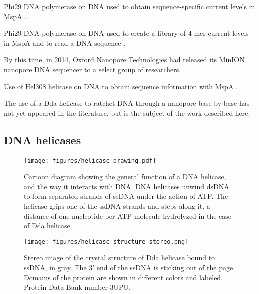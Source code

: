 Phi29 DNA polymerase on DNA used to obtain sequence-specific current levels in MspA \citep{Manrao2012}.

Phi29 DNA polymerase on DNA used to create a library of 4-mer current levels in MspA and to read a DNA sequence \citep{Laszlo2014}.

By this time, in 2014, Oxford Nanopore Technologies had released its MinION nanopore DNA sequencer to a select group of researchers.

Use of Hel308 helicase on DNA to obtain sequence information with MspA \citep{Derrington2015}.

The use of a Dda helicase to ratchet DNA through a nanopore base-by-base has not yet appeared in the literature, but is the subject of the work described here.

\subsection{DNA helicases}

\begin{figure}[h]
\begin{centering}
\texttt{[image: figures/helicase\_drawing.pdf]}
\caption[DNA helicase general function]{Cartoon diagram showing the general function of a DNA helicase, and the way it interacts with DNA.  DNA helicases unwind dsDNA to form separated strands of ssDNA under the action of ATP.  The helicase grips one of the ssDNA strands and steps along it, a distance of one nucleotide per ATP molecule hydrolyzed in the case of Dda helicase.}
\label{fig:helicase_drawing}
\end{centering}
\end{figure}

\begin{figure}[h]
\begin{centering}
\texttt{[image: figures/helicase\_structure\_stereo.png]}
\caption[Dda helicase structure]{Stereo image of the crystal structure of Dda helicase bound to ssDNA, in gray.  The 3' end of the ssDNA is sticking out of the page.  Domains of the protein are shown in different colors and labeled.  Protein Data Bank number 3UPU. \citep{He2012}}
\label{fig:helicase_stereo}
\end{centering}
\end{figure}

